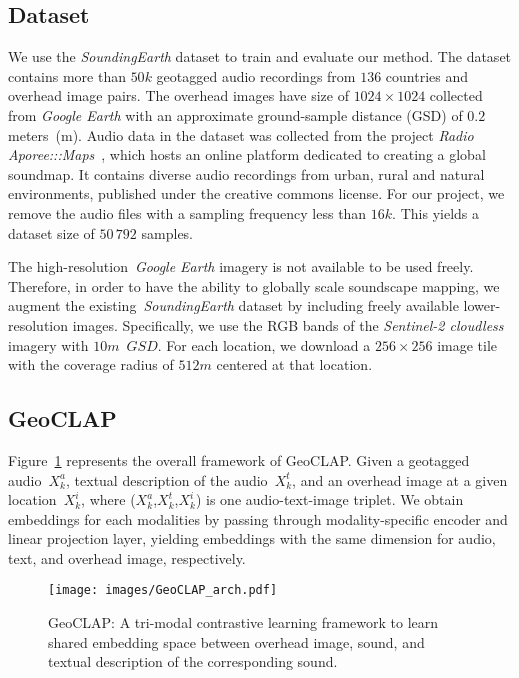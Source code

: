 \documentclass{bmvc2k}
\begin{document}
\subsection{Dataset}
\label{sec:dataset}

We use the {\em SoundingEarth} dataset to train and evaluate our method. The dataset contains more than $50k$ geotagged audio recordings from $136$ countries and overhead image pairs. The overhead images have size of  ${1024} \times {1024}$ collected from {\em Google Earth} with an approximate ground-sample distance (GSD) of $0.2$ meters~(m). Audio data in the dataset was collected from the project {\em Radio Aporee:::Maps}~\cite{aporee}, which hosts an online platform dedicated to creating a global soundmap. It contains diverse audio recordings from urban, rural and natural environments, published under the creative commons license. For our project, we remove the audio files with a sampling frequency less than $16k$. This yields a dataset size of $50\,792$ samples. 

The high-resolution~{\em Google Earth} imagery is not available to be used freely. Therefore, in order to have the ability to globally scale soundscape mapping, we augment the existing~{\em SoundingEarth} dataset by including freely available lower-resolution images. Specifically, we use the RGB bands of the \textit{Sentinel-2 cloudless} imagery with $10m$~$GSD$. For each location, we download a $256 \times 256$ image tile with the coverage radius of $512m$ centered at that location.

\subsection{GeoCLAP}

Figure~\ref{fig:geoclap} represents the overall framework of GeoCLAP. Given a geotagged audio~$X_{k}^{a}$, textual description of the audio~$X_{k}^{t}$, and an overhead image at a given location~$X_{k}^{i}$, where ($X_{k}^{a}$,$X_{k}^{t}$,$X_{k}^{i}$) is one audio-text-image triplet. We obtain embeddings for each modalities by passing through modality-specific encoder and linear projection layer, yielding embeddings with the same dimension for audio, text, and overhead image, respectively.
\begin{figure}[!ht]
    \centering
    \texttt{[image: images/GeoCLAP\_arch.pdf]}
    \caption{GeoCLAP: A tri-modal contrastive learning framework to learn shared embedding space between overhead image, sound, and textual description of the corresponding sound.}
    \label{fig:geoclap}
\end{figure}
\end{document}
